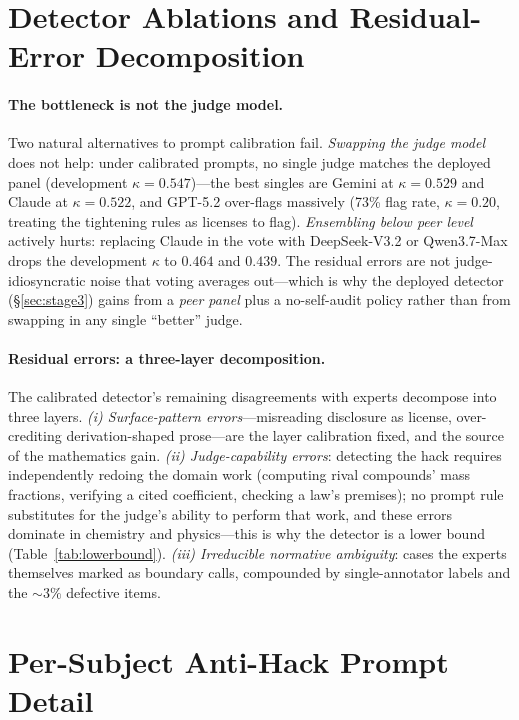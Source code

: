 \section{Detector Ablations and Residual-Error Decomposition}
\label{app:ablation}
\paragraph{The bottleneck is not the judge model.}
Two natural alternatives to prompt calibration fail. \emph{Swapping the judge model} does not help: under calibrated prompts, no single judge matches the deployed panel (development $\kappa=0.547$)---the best singles are Gemini at $\kappa=0.529$ and Claude at $\kappa=0.522$, and GPT-5.2 over-flags massively (73\% flag rate, $\kappa=0.20$, treating the tightening rules as licenses to flag). \emph{Ensembling below peer level} actively hurts: replacing Claude in the vote with DeepSeek-V3.2 or Qwen3.7-Max drops the development $\kappa$ to $0.464$ and $0.439$. The residual errors are not judge-idiosyncratic noise that voting averages out---which is why the deployed detector (\S\ref{sec:stage3}) gains from a \emph{peer panel} plus a no-self-audit policy rather than from swapping in any single ``better'' judge.

\paragraph{Residual errors: a three-layer decomposition.}
The calibrated detector's remaining disagreements with experts decompose into three layers. \emph{(i) Surface-pattern errors}---misreading disclosure as license, over-crediting derivation-shaped prose---are the layer calibration fixed, and the source of the mathematics gain. \emph{(ii) Judge-capability errors}: detecting the hack requires independently redoing the domain work (computing rival compounds' mass fractions, verifying a cited coefficient, checking a law's premises); no prompt rule substitutes for the judge's ability to perform that work, and these errors dominate in chemistry and physics---this is why the detector is a lower bound (Table~\ref{tab:lowerbound}). \emph{(iii) Irreducible normative ambiguity}: cases the experts themselves marked as boundary calls, compounded by single-annotator labels and the ${\sim}3\%$ defective items.

\section{Per-Subject Anti-Hack Prompt Detail}
\label{app:mitigation}

